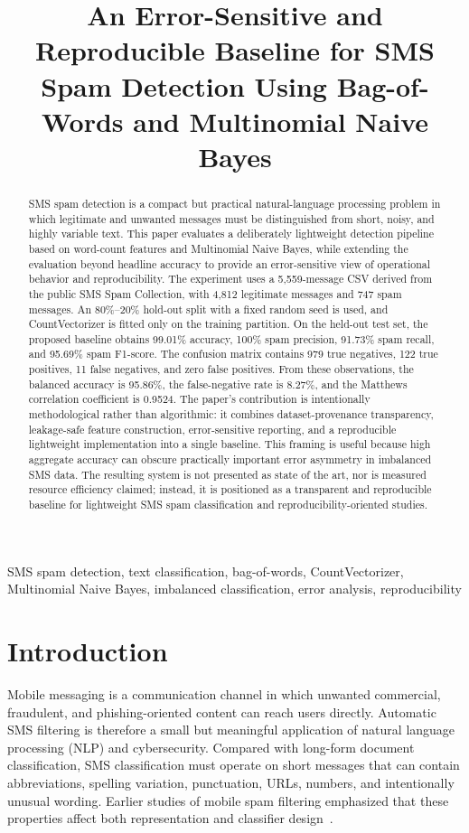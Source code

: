 \documentclass[conference]{IEEEtran}
\title{An Error-Sensitive and Reproducible Baseline for SMS Spam Detection Using Bag-of-Words and Multinomial Naive Bayes}
\author{
\IEEEauthorblockN{Aritrik Ghosh}
\IEEEauthorblockA{
Department of Computer Science and Engineering\\
Swami Vivekananda University, India}
}
\begin{document}
\maketitle

\begin{abstract}
SMS spam detection is a compact but practical natural-language processing problem in which legitimate and unwanted messages must be distinguished from short, noisy, and highly variable text. This paper evaluates a deliberately lightweight detection pipeline based on word-count features and Multinomial Naive Bayes, while extending the evaluation beyond headline accuracy to provide an error-sensitive view of operational behavior and reproducibility. The experiment uses a 5,559-message CSV derived from the public SMS Spam Collection, with 4,812 legitimate messages and 747 spam messages. An 80\%--20\% hold-out split with a fixed random seed is used, and CountVectorizer is fitted only on the training partition. On the held-out test set, the proposed baseline obtains 99.01\% accuracy, 100\% spam precision, 91.73\% spam recall, and 95.69\% spam F1-score. The confusion matrix contains 979 true negatives, 122 true positives, 11 false negatives, and zero false positives. From these observations, the balanced accuracy is 95.86\%, the false-negative rate is 8.27\%, and the Matthews correlation coefficient is 0.9524. The paper's contribution is intentionally methodological rather than algorithmic: it combines dataset-provenance transparency, leakage-safe feature construction, error-sensitive reporting, and a reproducible lightweight implementation into a single baseline. This framing is useful because high aggregate accuracy can obscure practically important error asymmetry in imbalanced SMS data. The resulting system is not presented as state of the art, nor is measured resource efficiency claimed; instead, it is positioned as a transparent and reproducible baseline for lightweight SMS spam classification and reproducibility-oriented studies.
\end{abstract}

\begin{IEEEkeywords}
SMS spam detection, text classification, bag-of-words, CountVectorizer, Multinomial Naive Bayes, imbalanced classification, error analysis, reproducibility
\end{IEEEkeywords}

\section{Introduction}
Mobile messaging is a communication channel in which unwanted commercial, fraudulent, and phishing-oriented content can reach users directly. Automatic SMS filtering is therefore a small but meaningful application of natural language processing (NLP) and cybersecurity. Compared with long-form document classification, SMS classification must operate on short messages that can contain abbreviations, spelling variation, punctuation, URLs, numbers, and intentionally unusual wording. Earlier studies of mobile spam filtering emphasized that these properties affect both representation and classifier design~\cite{cormack2007feature,cormack2007spam}.
\end{document}
